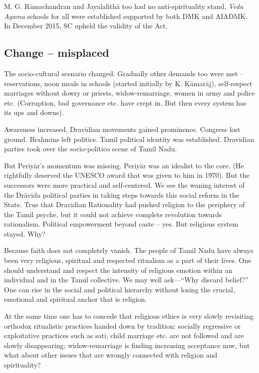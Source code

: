 M. G. Rāmachandran and Jayalalithā too had no anti-spirituality stand. \textit{Veda Agama} schools for all were established supported by both DMK and AIADMK. In December 2015, SC upheld the validity of the Act.


\subsection{Change – misplaced}

\vskip -7pt

The socio-cultural scenario changed. Gradually other demands too were met – reservations, noon meals in schools (started initially by K. Kāmarāj), self-respect marriages without dowry or priests, widow-remarriage, women in army and police etc. (Corruption, bad governance etc. have crept in. But then every system has its ups and downs).

Awareness increased, Dravidian movements gained prominence. Congress lost ground. Brahmins left politics. Tamil political identity was established. Dravidian parties took over the socio-politico scene of Tamil Nadu.

But Periyār’s momentum was missing. Periyār was an idealist to the core. (He rightfully deserved the UNESCO award that was given to him in 1970). But the successors were more practical and self-centered. We see the waning interest of the Drāvida political parties in taking steps towards this social reform in the State. True that Dravidian Rationality had pushed religion to the periphery of the Tamil psyche, but it could not achieve complete revolution towards rationalism. Political empowerment beyond caste – yes. But religious system stayed. Why?

Because faith does not completely vanish. The people of Tamil Nadu have always been very religious, spiritual and respected ritualism as a part of their lives. One should understand and respect the intensity of religious emotion within an individual and in the Tamil collective. We may well ask—“Why discard belief?” One can rise in the social and political hierarchy without losing the crucial, emotional and spiritual anchor that is religion.

At the same time one has to concede that religious ethics is very slowly revisiting orthodox ritualistic practices handed down by tradition: socially regressive or exploitative practices such as sati, child marriage etc. are not followed and are slowly disappearing; widow-remarriage is finding increasing acceptance now, but what about other issues that are wrongly connected with religion and spirituality?



